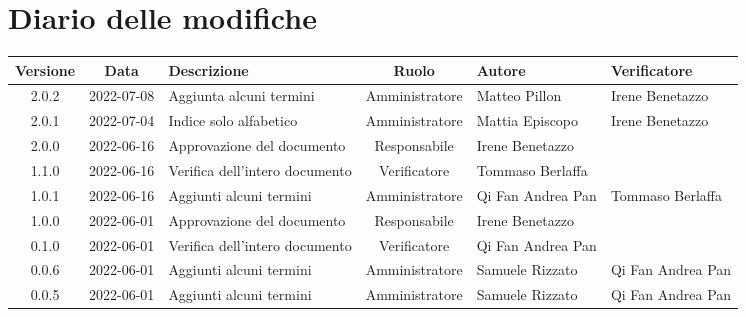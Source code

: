 \section*{Diario delle modifiche}
	\begin{center}
	\renewcommand{\arraystretch}{1.8} %
	\begin{longtable}{ |c|c|p{8em}|c|m{5em}|m{6em}| }
	\hline %
	\textbf{Versione} & \textbf{Data} & \textbf{Descrizione} &  \textbf{Ruolo} &  \textbf{Autore} & \textbf{Verificatore}\\ %
    \hline
    2.0.2 & 2022-07-08 & Aggiunta alcuni termini & Amministratore & Matteo \newline Pillon & Irene \newline Benetazzo \\
	\hline
	2.0.1 & 2022-07-04 & Indice solo alfabetico & Amministratore & Mattia \newline Episcopo & Irene Benetazzo \\
	\hline
    2.0.0 & 2022-06-16 & Approvazione del documento & Responsabile & Irene \newline Benetazzo & \\
	\hline
	1.1.0 & 2022-06-16 & Verifica dell'intero documento & Verificatore & Tommaso \newline Berlaffa & \\
	\hline
	1.0.1 & 2022-06-16 & Aggiunti alcuni termini & Amministratore & Qi Fan \newline Andrea Pan &  Tommaso \newline Berlaffa \\
	\hline 
	1.0.0 & 2022-06-01 & Approvazione del documento & Responsabile & Irene \newline Benetazzo & \\
	\hline
	0.1.0 & 2022-06-01 & Verifica dell'intero documento & Verificatore & Qi Fan \newline Andrea Pan & \\
	\hline
	0.0.6 & 2022-06-01 & Aggiunti alcuni termini & Amministratore & Samuele \newline Rizzato &Qi Fan \newline Andrea Pan \\
	\hline
	0.0.5 & 2022-06-01 & Aggiunti alcuni termini & Amministratore & Samuele \newline Rizzato &Qi Fan \newline Andrea Pan \\

\end{longtable}
\end{center}
